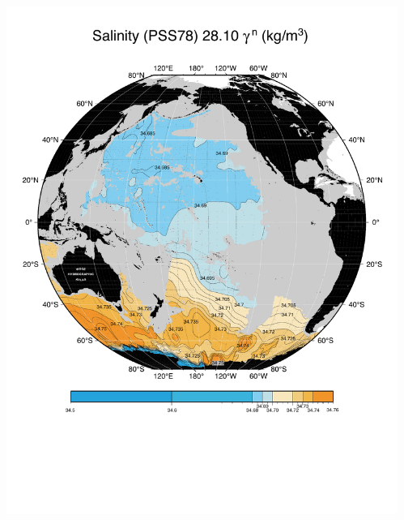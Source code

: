 \documentclass{beamer}
\begin{document}
\begin{frame}[plain,t]
    \begin{columns}
      \begin{column}{0.33\textwidth}
        \includegraphics[width=\textwidth]{salnty_isopyc_final_pdf/pac2810_salnty_final_color.pdf}  
       \end{column}
      \begin{column}{0.33\textwidth}

\end{column}
\end{columns}
\end{frame}
\end{document}
